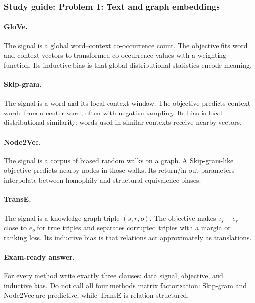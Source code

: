 \documentclass[11pt,a4paper]{article}
\begin{document}
\subsubsection{Study guide: Problem 1: Text and graph embeddings}

\paragraph{GloVe.}

The signal is a global word--context co-occurrence count. The objective fits word and context vectors to transformed co-occurrence values with a weighting function. Its inductive bias is that global distributional statistics encode meaning.

\paragraph{Skip-gram.}

The signal is a word and its local context window. The objective predicts context words from a center word, often with negative sampling. Its bias is local distributional similarity: words used in similar contexts receive nearby vectors.

\paragraph{Node2Vec.}

The signal is a corpus of biased random walks on a graph. A Skip-gram-like objective predicts nearby nodes in those walks. Its return/in-out parameters interpolate between homophily and structural-equivalence biases.

\paragraph{TransE.}

The signal is a knowledge-graph triple $(s,r,o)$. The objective makes $e_s+e_r$ close to $e_o$ for true triples and separates corrupted triples with a margin or ranking loss. Its inductive bias is that relations act approximately as translations.

\paragraph{Exam-ready answer.}

For every method write exactly three clauses: data signal, objective, and inductive bias. Do not call all four methods matrix factorization: Skip-gram and Node2Vec are predictive, while TransE is relation-structured.
\end{document}
